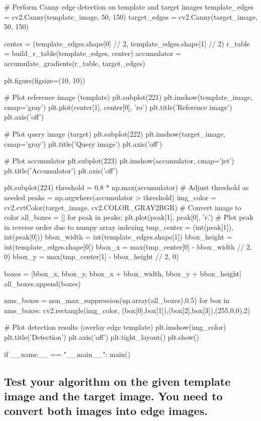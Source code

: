 \documentclass[10pt]{article}
\begin{document}
\begin{python}
    # Perform Canny edge detection on template and target images
    template_edges = cv2.Canny(template_image, 50, 150)
    target_edges = cv2.Canny(target_image, 50, 150)

    center = (template_edges.shape[0] // 2, template_edges.shape[1] // 2)
    r_table = build_r_table(template_edges, center)
    accumulator = accumulate_gradients(r_table, target_edges)

    plt.figure(figsize=(10, 10))

    # Plot reference image (template)
    plt.subplot(221)
    plt.imshow(template_image, cmap='gray')
    plt.plot(center[1], center[0], 'ro')
    plt.title('Reference image')
    plt.axis('off')

    # Plot query image (target)
    plt.subplot(222)
    plt.imshow(target_image, cmap='gray')
    plt.title('Query image')
    plt.axis('off')

    # Plot accumulator
    plt.subplot(223)
    plt.imshow(accumulator, cmap='jet')
    plt.title('Accumulator')
    plt.axis('off')

    plt.subplot(224)
    threshold = 0.8 * np.max(accumulator)  # Adjust threshold as needed
    peaks = np.argwhere(accumulator > threshold)
    img_color = cv2.cvtColor(target_image, cv2.COLOR_GRAY2BGR)  # Convert image to color
    all_boxes = []
    for peak in peaks:
        plt.plot(peak[1], peak[0], 'r.')  # Plot peak in reverse order due to numpy array indexing
        tmp_center = (int(peak[1]), int(peak[0]))
        bbox_width = int(template_edges.shape[1])
        bbox_height = int(template_edges.shape[0])
        bbox_x = max(tmp_center[0] - bbox_width // 2, 0)
        bbox_y = max(tmp_center[1] - bbox_height // 2, 0)

        boxes = [bbox_x, bbox_y, bbox_x + bbox_width, bbox_y + bbox_height]
        all_boxes.append(boxes)
        
    nms_boxes = non_max_suppression(np.array(all_boxes),0.5)
    for box in nms_boxes:
        cv2.rectangle(img_color, (box[0],box[1]),(box[2],box[3]),(255,0,0),2)
        
    # Plot detection results (overlay edge template)
    plt.imshow(img_color)
    plt.title('Detection')
    plt.axis('off')
    plt.tight_layout()
    plt.show()
    
if __name__ == "__main__":
    main()
\end{python}

\subsection*{Test your algorithm on the given template image and the target image. You need to convert both images into edge images.}
\end{document}
